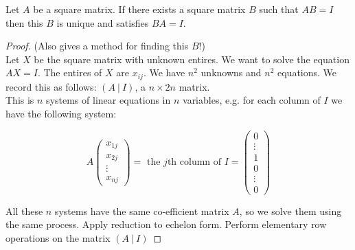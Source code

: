 \documentclass[10pt]{scrartcl}
\begin{document}
\vspace*{5pt}
\begin{theorem}Let  $A$ be a square matrix. If there exists a square matrix $B$ such that $AB = I$ then this $B$ is unique and satisfies $BA = I$.	
\end{theorem}

\begin{proof}
(Also gives a method for finding this $B$!)\\	Let $X$ be the square matrix with unknown entires. We want to solve the equation $AX = I$. The entires of $X$ are $x_{ij}$. We have $n^2$ unknowns and $n^2$ equations. We record this as follows: $(A ~|~ I)$, a $n \times 2n$ matrix.\\

This is $n$ systems of linear equations in $n$ variables, e.g. for each column of $I$ we have the following system:

\[A\left(\begin{smallmatrix}
x_{1j}\\x_{2j}\\ \vdots \\ x_{nj}	
\end{smallmatrix}
\right)= \text{ the } j\text{th column of } I = \left(\begin{smallmatrix}
0\\ \vdots \\ 1 \\ 0 \\ \vdots \\ 0
\end{smallmatrix}\right)  
\] 

All these $n$ systems have the same co-efficient matrix $A$, so we solve them using the same process. Apply reduction to echelon form. Perform elementary row operations on the matrix $(A ~|~ I)$



\end{proof}
\end{document}
